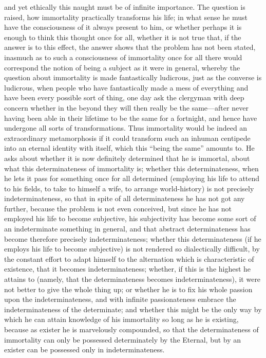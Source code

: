 \documentclass[12pt]{article}
\begin{document}
and yet ethically this naught must be of infinite importance. The
question is raised, how immortality practically transforms his life; in
what sense he must have the consciousness of it always present to him,
or whether perhaps it is enough to think this thought once for all,
whether it is not true that, if the answer is to this effect, the
answer shows that the problem has not been stated, inasmuch as to such
a consciousness of immortality once for all there would correspond the
notion of being a subject as it were in general, whereby the question
about immortality is made fantastically ludicrous, just as the converse
is ludicrous, when people who have fantastically made a mess of
everything and have been every possible sort of thing, one day ask the
clergyman with deep concern whether in the beyond they will then really
be the same---after never having been able in their lifetime to be the
same for a fortnight, and hence have undergone all sorts of
transformations. Thus immortality would be indeed an extraordinary
metamorphosis if it could transform such an inhuman centipede into an
eternal identity with itself, which this ``being the same'' amounts to.
He asks about whether it is now definitely determined that he is
immortal, about what this determinateness of immortality is; whether
this determinateness, when he lets it pass for something once for all
determined (employing his life to attend to his fields, to take to
himself a wife, to arrange world-history) is not precisely
indeterminateness, so that in spite of all determinateness he has not
got any further, because the problem is not even conceived, but since
he has not employed his life to become subjective, his subjectivity has
become some sort of an indeterminate something in general, and that
abstract determinateness has become therefore precisely
indeterminateness; whether this determinateness (if he employs his
life to become subjective) is not rendered so dialectically difficult,
by the constant effort to adapt himself to the alternation which is
characteristic of existence, that it becomes indeterminateness;
whether, if this is the highest he attains to (namely, that the
determinateness becomes indeterminateness), it were not better to give
the whole thing up; or whether he is to fix his whole passion upon the
indeterminateness, and with infinite passionateness embrace the
indeterminateness of the determinate; and whether this might be the
only way by which he can attain knowledge of his immortality so long
as he is existing, because as exister he is marvelously compounded, so
that the determinateness of immortality can only be possessed
determinately by the Eternal, but by an exister can be possessed only
in indeterminateness.
\end{document}
